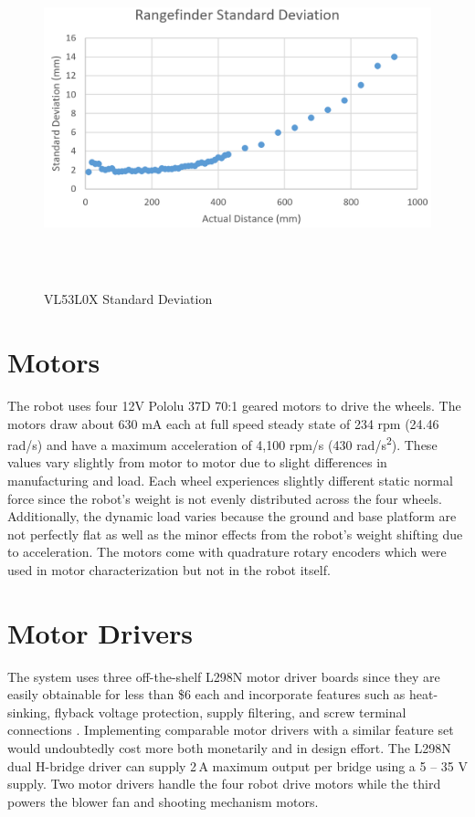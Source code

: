 \begin{figure}[H]   %
	\centering \includegraphics[width=6in, height=3.85in, keepaspectratio]{figures/rangefinder_stddev.png}
	\caption{VL53L0X Standard Deviation}\label{fig:rangefinder_stddev}
\end{figure}
\section{Motors}
The robot uses four 12V Pololu 37D 70:1 geared motors to drive the wheels. The motors draw about 630 mA each at full speed steady state of 234 rpm (24.46 rad/s) and have a maximum acceleration of 4,100 rpm/s (430 rad/s\textsuperscript{2}). These values vary slightly from motor to motor due to slight differences in manufacturing and load. Each wheel experiences slightly different static normal force since the robot's weight is not evenly distributed across the four wheels. Additionally, the dynamic load varies because the ground and base platform are not perfectly flat as well as the minor effects from the robot's weight shifting due to acceleration. The motors come with quadrature rotary encoders which were used in motor characterization but not in the robot itself.

\section{Motor Drivers}
The system uses three off-the-shelf L298N motor driver boards since they are easily obtainable for less than \$6 each and incorporate features such as heat-sinking, flyback voltage protection, supply filtering, and screw terminal connections \cite{l298n_digi}. Implementing comparable motor drivers with a similar feature set would undoubtedly cost more both monetarily and in design effort. The L298N dual H-bridge driver can supply 2\,A maximum output per bridge using a 5 -- 35 V supply. Two motor drivers handle the four robot drive motors while the third powers the blower fan and shooting mechanism motors. 

